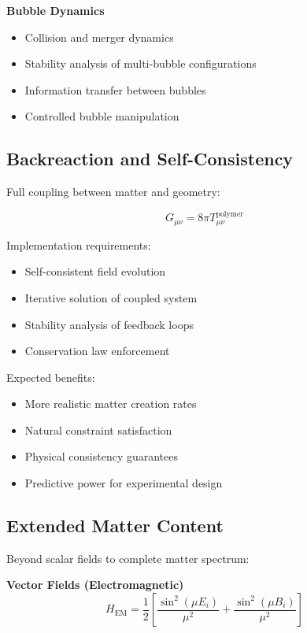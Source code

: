 \documentclass[11pt]{article}
\begin{document}
\textbf{Bubble Dynamics}
\begin{itemize}
\item Collision and merger dynamics
\item Stability analysis of multi-bubble configurations
\item Information transfer between bubbles
\item Controlled bubble manipulation
\end{itemize}

\subsection{Backreaction and Self-Consistency}

Full coupling between matter and geometry:

\begin{equation}
G_{\mu\nu} = 8\pi T_{\mu\nu}^{\text{polymer}}
\end{equation}

Implementation requirements:
\begin{itemize}
\item Self-consistent field evolution
\item Iterative solution of coupled system
\item Stability analysis of feedback loops
\item Conservation law enforcement
\end{itemize}

Expected benefits:
\begin{itemize}
\item More realistic matter creation rates
\item Natural constraint satisfaction
\item Physical consistency guarantees
\item Predictive power for experimental design
\end{itemize}

\subsection{Extended Matter Content}

Beyond scalar fields to complete matter spectrum:

\textbf{Vector Fields (Electromagnetic)}
\begin{equation}
H_{\text{EM}} = \frac{1}{2}\left[\frac{\sin^2(\mu E_i)}{\mu^2} + \frac{\sin^2(\mu B_i)}{\mu^2}\right]
\end{equation}
\end{document}
